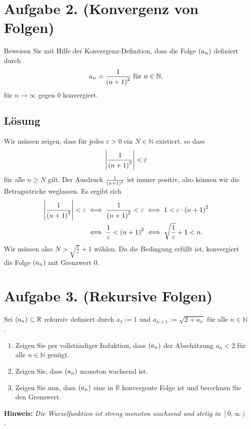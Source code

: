 \documentclass[german,12pt]{homework}
\newcommand{\NN}{\mathbb{N}}
\newcommand{\RR}{\mathbb{R}}
\DeclarePairedDelimiter{\absolute}{\lvert}{\rvert}
\DeclarePairedDelimiter{\enbrace}{(}{)}
\begin{document}
    \section*{Aufgabe 2. (Konvergenz von Folgen)}

    \begin{problem}
        Beweisen Sie mit Hilfe der Konvergenz-Definition, dass die Folge
        \(\enbrace*{a_n}\) definiert durch
        \[a_n = \frac{1}{\enbrace*{n + 1}^2}\text{ für }n \in \NN,\]
        für \(n \to \infty\) gegen \(0\) konvergiert.
    \end{problem}

    \subsection*{Lösung} Wir müssen zeigen, dass für jedes \(\varepsilon > 0\)
    ein \(N \in \NN\) existiert, so dass
    \[\absolute*{\frac{1}{\enbrace*{n + 1}^2}} < \varepsilon\]
    für alle \(n \ge N\) gilt. Der Ausdruck \(\frac{1}{\enbrace*{n + 1}^2}\)
    ist immer positiv, also können wir die Betragsstriche weglassen. Es ergibt
    sich
    \begin{align*}
        \absolute*{\frac{1}{\enbrace*{n + 1}^2}} < \varepsilon &\iff
        \frac{1}{\enbrace*{n + 1}^2} < \varepsilon \iff 1 < \varepsilon \cdot
        \enbrace*{n + 1}^2\\
        &\iff \frac{1}{\varepsilon} < \enbrace*{n + 1}^2 \iff
        \sqrt{\frac{1}{\varepsilon}} + 1 < n.
    \end{align*}
    Wir müssen also \(N > \sqrt{\frac{1}{\varepsilon}} + 1\) wählen. Da die
    Bedingung erfüllt ist, konvergiert die Folge \(\enbrace*{a_n}\) mit
    Grenzwert \(0\).

    \section*{Aufgabe 3. (Rekursive Folgen)}

    \begin{problem}
        Sei \(\enbrace*{a_n} \subset \RR\) rekursiv definiert durch \(a_1 :=
        1\) und \(a_{n + 1} := \sqrt{2 + a_n}\) für alle \(n \in \NN\).
        \begin{enumerate}
            \item Zeigen Sie per vollständiger Induktion, dass
            \(\enbrace*{a_n}\) der Abschätzung \(a_n < 2\) für alle \(n \in
            \NN\) genügt.
            \item Zeigen Sie, dass \(\enbrace*{a_n}\) monoton wachsend ist.
            \item Zeigen Sie nun, dass \(\enbrace*{a_n}\) eine in \(\RR\)
            konvergente Folge ist und berechnen Sie den Grenzwert.
        \end{enumerate}

        \textbf{Hinweis:} \quad \emph{Die Wurzelfunktion ist streng monoton
        wachsend und stetig in \(\left[0, \infty\right)\).}
    \end{problem}
\end{document}
